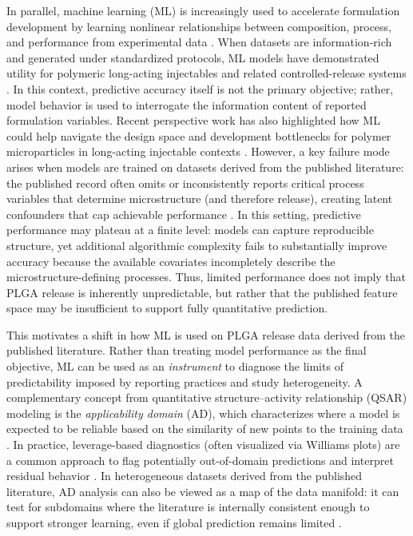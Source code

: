 \documentclass[preprint,12pt,authoryear]{elsarticle}
\begin{document}
In parallel, machine learning (ML) is increasingly used to accelerate formulation development by learning nonlinear relationships between composition, process, and performance from experimental data \citep{Bannigan2021}. When datasets are information-rich and generated under standardized protocols, ML models have demonstrated utility for polymeric long-acting injectables and related controlled-release systems \citep{Bannigan2023LAI}. In this context, predictive accuracy itself is not the primary objective; rather, model behavior is used to interrogate the information content of reported formulation variables. Recent perspective work has also highlighted how ML could help navigate the design space and development bottlenecks for polymer microparticles in long-acting injectable contexts \citep{Bao2025IJP}. However, a key failure mode arises when models are trained on datasets derived from the published literature: the published record often omits or inconsistently reports critical process variables that determine microstructure (and therefore release), creating latent confounders that cap achievable performance \citep{Jain2000, Fredenberg2011}. In this setting, predictive performance may plateau at a finite level: models can capture reproducible structure, yet additional algorithmic complexity fails to substantially improve accuracy because the available covariates incompletely describe the microstructure-defining processes. Thus, limited performance does not imply that PLGA release is inherently unpredictable, but rather that the published feature space may be insufficient to support fully quantitative prediction.


This motivates a shift in how ML is used on PLGA release data derived from the published literature. Rather than treating model performance as the final objective, ML can be used as an \emph{instrument} to diagnose the limits of predictability imposed by reporting practices and study heterogeneity. A complementary concept from quantitative structure--activity relationship (QSAR) modeling is the \emph{applicability domain} (AD), which characterizes where a model is expected to be reliable based on the similarity of new points to the training data \citep{OECD2004QSAR, Netzeva2005AD}. In practice, leverage-based diagnostics (often visualized via Williams plots) are a common approach to flag potentially out-of-domain predictions and interpret residual behavior \citep{WeaverGleeson2008}. In heterogeneous datasets derived from the published literature, AD analysis can also be viewed as a map of the data manifold: it can test for subdomains where the literature is internally consistent enough to support stronger learning, even if global prediction remains limited \citep{Netzeva2005AD, WeaverGleeson2008}.
\end{document}
